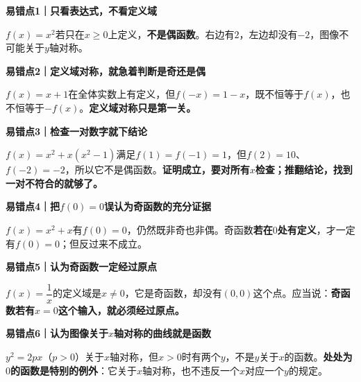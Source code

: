 \clearpage
\begin{trapbox}
\textbf{易错点1｜只看表达式，不看定义域}



$f(x)=x^2$若只在$x\geq0$上定义，\textbf{不是偶函数}。右边有$2$，左边却没有$-2$，图像不可能关于$y$轴对称。

\medskip
\textbf{易错点2｜定义域对称，就急着判断是奇还是偶}

$f(x)=x+1$在全体实数上有定义，但$f(-x)=1-x$，既不恒等于$f(x)$，也不恒等于$-f(x)$。\textbf{定义域对称只是第一关。}

\medskip
\end{trapbox}
\clearpage
\begin{trapbox}
\textbf{易错点3｜检查一对数字就下结论}



$f(x)=x^2+x(x^2-1)$满足$f(1)=f(-1)=1$，但$f(2)=10$、$f(-2)=-2$，所以它不是偶函数。\textbf{证明成立，要对所有$x$检查；推翻结论，找到一对不符合的就够了。}

\medskip
\end{trapbox}
\clearpage
\begin{trapbox}
\textbf{易错点4｜把$f(0)=0$误认为奇函数的充分证据}



$f(x)=x^2+x$有$f(0)=0$，仍然既非奇也非偶。奇函数\textbf{若在$0$处有定义}，才一定有$f(0)=0$；但反过来不成立。

\medskip
\end{trapbox}
\clearpage
\begin{trapbox}
\textbf{易错点5｜认为奇函数一定经过原点}



$f(x)=\dfrac1x$的定义域是$x\ne0$，它是奇函数，却没有$(0,0)$这个点。应当说：\textbf{奇函数若有$x=0$这个输入，就必须经过原点。}

\medskip
\end{trapbox}
\clearpage
\begin{trapbox}
\textbf{易错点6｜认为图像关于$x$轴对称的曲线就是函数}


\begin{center}

\end{center}




$y^2=2px$（$p>0$）关于$x$轴对称，但$x>0$时有两个$y$，不是$y$关于$x$的函数。\textbf{处处为$0$的函数是特别的例外}：它关于$x$轴对称，也不违反一个$x$对应一个$y$的规定。

\medskip
\end{trapbox}
